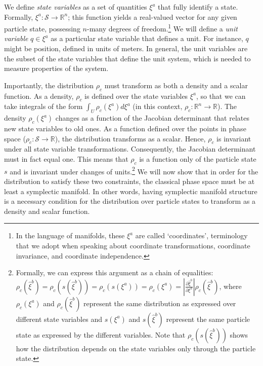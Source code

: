 \documentclass[letterpaper]{article}
\begin{document}
We define \textit{state variables} as a set of quantities $\xi^a$ that fully identify a state. Formally, $\xi^a: \mathcal{S} \to \mathbb{R}^n$; this function yields a real-valued vector for any given particle state, possessing $n$-many degrees of freedom.\footnote{In the language of manifolds, these $\xi^a$ are called `coordinates', terminology that we adopt when speaking about coordinate transformations, coordinate invariance, and coordinate independence.} We will define a \textit{unit variable} $q \in \xi^a$ as a particular state variable that defines a unit.  For instance, $q$ might be position, defined in units of meters. In general, the unit variables are the subset of the state variables that define the unit system, which is needed to measure properties of the system. 


Importantly, the distribution $\rho_c$ must transform as both a density and a scalar function. As a density, $\rho_c$ is defined over the state variables $\xi^a$, so that we can take integrals of the form $\int_U \rho_c(\xi^a) d\xi^a$ (in this context, $\rho_c:  \mathbb{R}^n \to \mathbb{R}$). The density $\rho_c(\xi^a)$ changes as a function of the Jacobian determinant that relates new state variables to old ones. As a function defined over the points in phase space ($\rho_c : \mathcal{S} \to \mathbb{R} $), the distribution transforms as a scalar. Hence, $\rho_c$ is invariant under all state variable transformations. Consequently, the Jacobian determinant must in fact equal one. This means that $\rho_c$ is a function only of the particle state $s$ and is invariant under changes of units.\footnote{Formally, we can express this argument as a chain of equalities: $\rho_c(\hat{\xi}^b)=\rho_c(s(\hat{\xi}^b))=\rho_c(s(\xi^a))=\rho_c(\xi^a) = \left|\frac{\partial \hat{\xi}^b}{\partial \xi^a} \right| \rho_c(\hat\xi^b)$, where $\rho_c(\xi^a)$ and $\rho_c(\hat{\xi}^b)$ represent the same distribution as expressed over different state variables and $s(\xi^a)$ and $s(\hat{\xi}^b)$ represent the same particle state as expressed by the different variables. Note that $\rho_c(s(\hat{\xi}^b))$ shows how the distribution depends on the state variables only through the particle state.} We will now show that in order for the distribution to satisfy these two constraints, the classical phase space must be at least a symplectic manifold. In other words, having symplectic manifold structure is a necessary condition for the distribution over particle states to transform as a density and scalar function.
\end{document}
